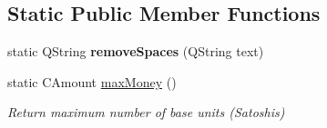 \subsection*{Static Public Member Functions}
\begin{DoxyCompactItemize}
\item 
\mbox{\label{class_bitcoin_units_a9354c3d913372b03101a23dc9cd18023}} 
static Q\+String {\bfseries remove\+Spaces} (Q\+String text)
\item 
\mbox{\label{class_bitcoin_units_a310bc10d6973f335b5757a341909b7fe}} 
static C\+Amount \mbox{\hyperlink{class_bitcoin_units_a310bc10d6973f335b5757a341909b7fe}{max\+Money}} ()
\begin{DoxyCompactList}\small\item\em Return maximum number of base units (Satoshis) \end{DoxyCompactList}\end{DoxyCompactItemize}
